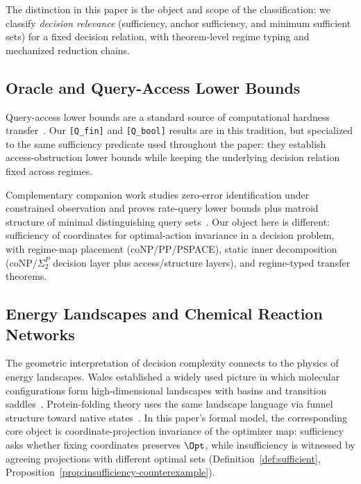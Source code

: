 The distinction in this paper is the object and scope of the classification: we classify \emph{decision relevance} (sufficiency, anchor sufficiency, and minimum sufficient sets) for a fixed decision relation, with theorem-level regime typing and mechanized reduction chains.

\subsection{Oracle and Query-Access Lower Bounds}

Query-access lower bounds are a standard source of computational hardness transfer~\cite{dobzinski2012query,buhrman2002complexity}. Our \texttt{[Q\_fin]} and \texttt{[Q\_bool]} results are in this tradition, but specialized to the same sufficiency predicate used throughout the paper: they establish access-obstruction lower bounds while keeping the underlying decision relation fixed across regimes.

Complementary companion work studies zero-error identification under constrained observation and proves rate-query lower bounds plus matroid structure of minimal distinguishing query sets~\cite{simas2026identification}. Our object here is different: sufficiency of coordinates for optimal-action invariance in a decision problem, with regime-map placement (coNP/PP/PSPACE), static inner decomposition (coNP/$\Sigma_2^P$ decision layer plus access/structure layers), and regime-typed transfer theorems.

\subsection{Energy Landscapes and Chemical Reaction Networks}

The geometric interpretation of decision complexity connects to the physics of energy landscapes. Wales established a widely used picture in which molecular configurations form high-dimensional landscapes with basins and transition saddles~\cite{wales2003energy,wales2005energy,wales2018exploring}. Protein-folding theory uses the same landscape language via funnel structure toward native states~\cite{onuchic1997protein}. In this paper's formal model, the corresponding core object is coordinate-projection invariance of the optimizer map: sufficiency asks whether fixing coordinates preserves \(\Opt\), while insufficiency is witnessed by agreeing projections with different optimal sets (Definition~\ref{def:sufficient}, Proposition~\ref{prop:insufficiency-counterexample}).

